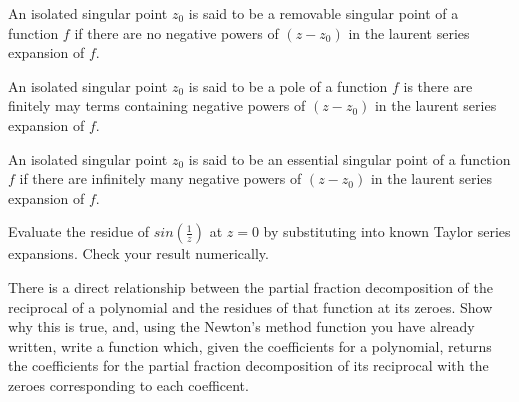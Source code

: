 An isolated singular point $z_0$ is said to be a removable singular point of a function $f$ if there are no negative powers of $(z-z_0)$ in the laurent series expansion of $f$.

An isolated singular point $z_0$ is said to be a pole of a function $f$ is there are finitely may terms containing negative powers of $(z-z_0)$ in the laurent series expansion of $f$. 

An isolated singular point $z_0$ is said to be an essential singular point of a function $f$ if there are infinitely many negative powers of $(z-z_0)$ in the laurent series expansion of $f$. 

\begin{problem}
Evaluate the residue of $sin(\frac{1}{z})$ at $z=0$ by substituting into known Taylor series expansions. Check your result numerically.
\end{problem}

\begin{problem}
There is a direct relationship between the partial fraction decomposition of the reciprocal of a polynomial and the residues of that function at its zeroes. Show why this is true, and, using the Newton's method function you have already written, write a function which, given the coefficients for a polynomial, returns the coefficients for the partial fraction decomposition of its reciprocal with the zeroes corresponding to each coefficent.
\end{problem}